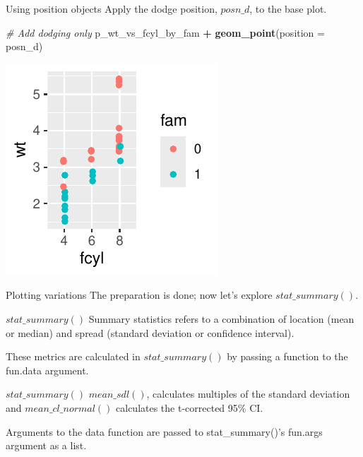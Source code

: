 \documentclass[
  ignorenonframetext,
]{beamer}
\newenvironment{Shaded}{\begin{snugshade}}{\end{snugshade}}
\newcommand{\AttributeTok}[1]{\textcolor[rgb]{0.13,0.29,0.53}{#1}}
\newcommand{\CommentTok}[1]{\textcolor[rgb]{0.56,0.35,0.01}{\textit{#1}}}
\newcommand{\FunctionTok}[1]{\textcolor[rgb]{0.13,0.29,0.53}{\textbf{#1}}}
\newcommand{\NormalTok}[1]{#1}
\newcommand{\SpecialCharTok}[1]{\textcolor[rgb]{0.81,0.36,0.00}{\textbf{#1}}}
\begin{document}
\begin{frame}[fragile]{Using position objects}
\label{using-position-objects-2}
Apply the dodge position, \(posn\_d\), to the base plot.


\begin{Shaded}
\begin{Highlighting}[]
\CommentTok{\# Add dodging only}
\NormalTok{p\_wt\_vs\_fcyl\_by\_fam }\SpecialCharTok{+} \FunctionTok{geom\_point}\NormalTok{(}\AttributeTok{position =}\NormalTok{ posn\_d)}
\end{Highlighting}
\end{Shaded}

\begin{center}\includegraphics[width=0.5\linewidth]{Figs/unnamed-chunk-31-1} \end{center}

Plotting variations The preparation is done; now let's explore
\(stat\_summary()\).
\end{frame}

\begin{frame}{\(stat\_summary()\)}
\label{stat_summary}
Summary statistics refers to a combination of location (mean or median)
and spread (standard deviation or confidence interval).

These metrics are calculated in \(stat\_summary()\) by passing a
function to the fun.data argument.
\end{frame}

\begin{frame}{\(stat\_summary()\)}
\label{stat_summary-1}
\(mean\_sdl()\), calculates multiples of the standard deviation and
\(mean\_cl\_normal()\) calculates the t-corrected 95\% CI.

Arguments to the data function are passed to stat\_summary()'s fun.args
argument as a list.
\end{frame}
\end{document}
